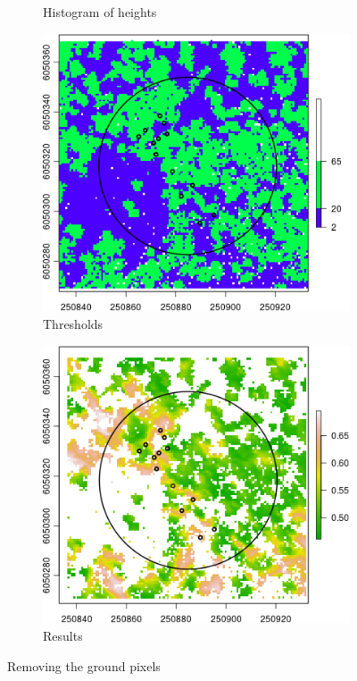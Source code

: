 \documentclass{subfiles}
\begin{document}
\begin{figure} [h!]
\begin{subfigure}[t]{.49\textwidth}
 		\caption{Histogram of heights} 
 		\label{fig:c5_heightHist}
 	\end{subfigure} \hfill
 	\begin{subfigure}[t]{.49\textwidth}
 		\centering
 		\includegraphics[width=\textwidth]{img/dead/c6_groundThres}
 		\caption{Thresholds} 
 		\label{fig:c6_groundMask}
 	\end{subfigure}
 	\begin{subfigure}[t]{.49\textwidth}
 		\centering
 		\includegraphics[width=\textwidth]{img/dead/c7_groundRemoved}
 		\caption{Results} 
 		\label{fig:c7_groundRemoved}
 	\end{subfigure}
 	\caption{Removing the ground pixels}  
 	\label{fig:GroundPixelsRemoval} 
 \end{figure}
 
\end{document}
